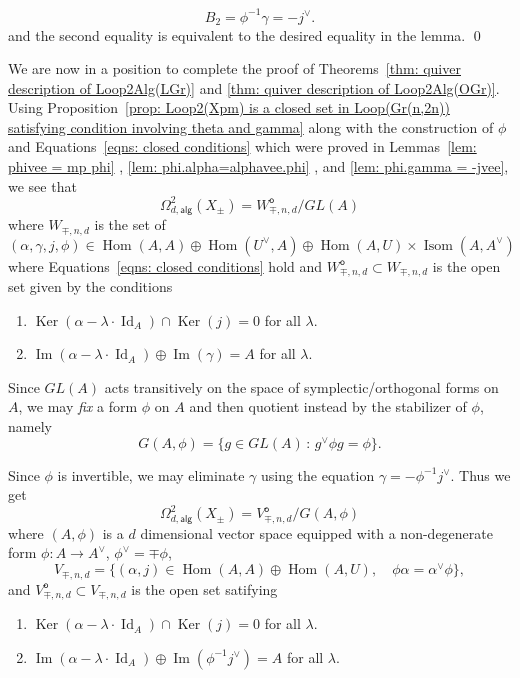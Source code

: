 \documentclass{amsart}
\theoremstyle{definition}
\newcommand{\Hom}{\operatorname{Hom}}
\newcommand{\Ker}{\operatorname{Ker}}
\newcommand{\im}{\operatorname{Im}}
\newcommand{\alg}{\mathsf{alg}}
\newcommand{\open}{\mathsf{o}}
\newcommand{\LoopTwo}{\Omega^{2}_{d,\alg}}
\newcommand{\Id}{\operatorname{Id}}
\newcommand{\Xpm}{X_{\pm}}
\begin{document}
\[
B_{2} = \phi^{-1}\gamma  = -j^{\vee}.
\]
and the second equality is equivalent to the desired equality in the lemma.
\qed 

We are now in a position to complete the proof of Theorems~\ref{thm:
quiver description of Loop2Alg(LGr)} and \ref{thm: quiver description
of Loop2Alg(OGr)}. Using Proposition~\ref{prop: Loop2(Xpm) is a closed set in
Loop(Gr(n,2n)) satisfying condition involving theta and gamma} along
with the construction of $\phi$ and Equations~\eqref{eqns: closed
conditions} which were proved in Lemmas~\ref{lem: phivee = mp phi} ,
\ref{lem: phi.alpha=alphavee.phi} , and \ref{lem: phi.gamma = -jvee},
we see that 
\[
\LoopTwo (\Xpm ) = W^{\open}_{\mp,n,d} / GL(A)
\]
where $W_{\mp ,n,d}$ is the set of
\[
(\alpha ,\gamma ,j,\phi )\in \Hom (A,A)\oplus \Hom
(U^{\vee},A)\oplus  \Hom (A,U)\times \operatorname{Isom}(A,A^{\vee})
\]
where Equations~\eqref{eqns: closed conditions} hold and $W^{\open}_{\mp
,n,d}\subset W_{\mp ,n,d}$ is the open set given by the conditions

\bigskip

\begin{enumerate}
\item $\Ker (\alpha -\lambda \cdot \Id_{A})\cap \Ker (j) = 0$ for all
$\lambda$.
\item  $\im (\alpha -\lambda \cdot \Id_{A})\oplus  \im (\gamma )=A$ for
all $\lambda$.
\end{enumerate}

\bigskip

Since $GL(A)$ acts transitively on the space of symplectic/orthogonal
forms on $A$, we may \emph{fix} a form $\phi$ on $A$ and then quotient
instead by the stabilizer of $\phi$, namely
\[
G(A,\phi ) = \{g\in GL(A)\,:\, g^{\vee}\phi g=\phi \}.
\]

Since $\phi$ is invertible, we may eliminate $\gamma$ using the
equation $\gamma =-\phi^{-1} j^{\vee}$. Thus we get
\[
\LoopTwo (\Xpm ) = V_{\mp ,n,d}^{\open}/G(A,\phi )
\]
where $(A,\phi )$ is a $d$ dimensional vector space equipped with a
non-degenerate form $\phi :A\to A^{\vee}$, $\phi^{\vee}=\mp \phi$,
\[
V_{\mp ,n,d} = \{(\alpha ,j)\in \Hom (A,A)\oplus \Hom (A,U),\quad \phi
\alpha =\alpha^{\vee}\phi \}, 
\]
and $V^{\open}_{\mp, n,d}\subset V_{\mp, n,d}$ is the open set satifying

\bigskip

\begin{enumerate}
\item $\Ker (\alpha -\lambda \cdot \Id_{A})\cap \Ker (j) = 0$ for all
$\lambda$.
\item  $\im (\alpha -\lambda \cdot \Id_{A})\oplus  \im (\phi^{-1}j^{\vee} )=A$ for
all $\lambda$.
\end{enumerate}
  
\end{document}
